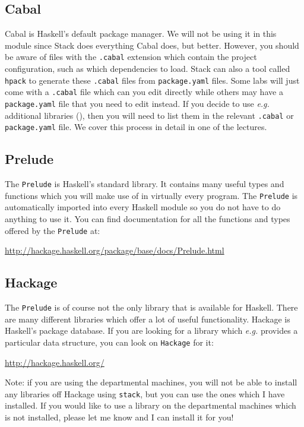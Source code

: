 \subsection{Cabal}

Cabal is Haskell's default package manager. We will not be using it in this module since Stack does everything Cabal does, but better. However, you should be aware of files with the \texttt{\small .cabal} extension which contain the project configuration, such as which dependencies to load. Stack can also a tool called \texttt{\small hpack} to generate these \texttt{\small .cabal} files from \texttt{\small package.yaml} files. Some labs will just come with a \texttt{\small .cabal} file which can you edit directly while others may have a \texttt{\small package.yaml} file that you need to edit instead. If you decide to use \emph{e.g.} additional libraries (), then you will need to list them in the relevant \texttt{\small .cabal} or \texttt{\small package.yaml} file. We cover this process in detail in one of the lectures.

\subsection{Prelude} 

The \texttt{\small Prelude} is Haskell's standard library. It contains many useful types and functions which you will make use of in virtually every program. The \texttt{\small Prelude} is automatically imported into every Haskell module so you do not have to do anything to use it. You can find documentation for all the functions and types offered by the \texttt{\small Prelude} at:
\begin{center}
\url{http://hackage.haskell.org/package/base/docs/Prelude.html}
\end{center}

\subsection{Hackage} 
\label{sec:hackage}

The \texttt{\small Prelude} is of course not the only library that is available for Haskell. There are many different libraries which offer a lot of useful functionality. Hackage is Haskell's package database. If you are looking for a library which \emph{e.g.} provides a particular data structure, you can look on \texttt{\small Hackage} for it:
\begin{center}
\url{http://hackage.haskell.org/}
\end{center}
Note: if you are using the departmental machines, you will not be able to install any libraries off Hackage using \texttt{\small stack}, but you can use the ones which I have installed. If you would like to use a library on the departmental machines which is not installed, please let me know and I can install it for you!

